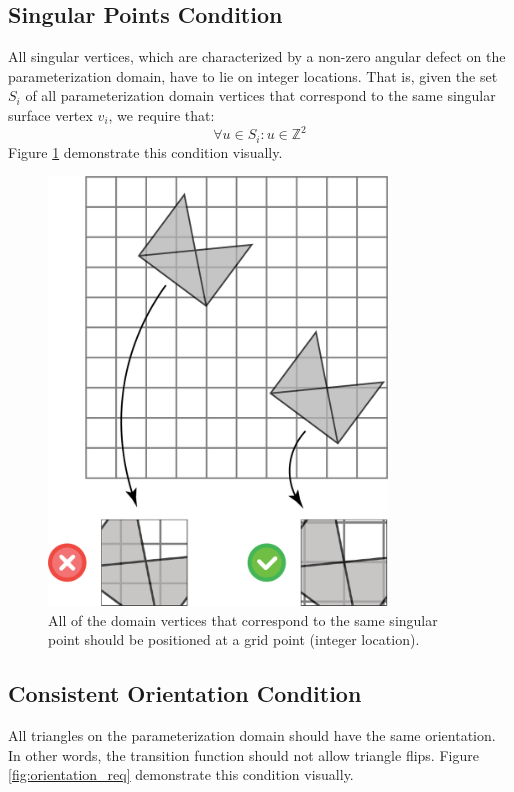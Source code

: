 \subsection{Singular Points Condition}
\label{label:singular_points_cond}
All singular vertices, which are characterized by a non-zero angular defect on the parameterization domain, have to lie on integer locations. That is, given the set $S_i$ of all parameterization domain vertices that correspond to the same singular surface vertex $v_i$, we require that:
$$\forall u \in S_i: u \in \mathbb{Z}^2 $$
Figure \ref{fig:singular_points_req} demonstrate this condition visually.
  
\begin{figure}[ht]
\centering
\includegraphics[width=9cm]{figures/singular_points/singularity.png}
\caption[The Singular Points Requirement]{All of the domain vertices that correspond to the same singular point should be positioned at a grid point (integer location).}
\label{fig:singular_points_req}
\end{figure}

\subsection{Consistent Orientation Condition}
\label{label:consistent_otrientation_cond}
All triangles on the parameterization domain should have the same orientation. In other words, the transition function should not allow triangle flips. Figure \ref{fig:orientation_req} demonstrate this condition visually.

